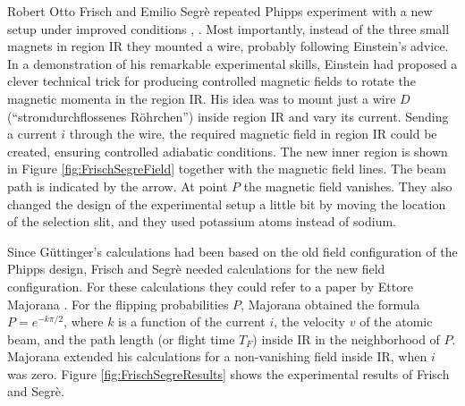 \documentclass{article}
\begin{document}
Robert Otto Frisch and Emilio Segrè repeated Phipps experiment with a new setup under improved conditions \citep{FrischOEtal1933Einstellung}, \cite[pp.~68--71]{SegreE1993Mind}.  Most importantly, instead of the three small magnets in region IR they mounted a wire, probably following Einstein's advice. In a demonstration of his remarkable experimental skills, Einstein had proposed a clever technical trick for producing controlled magnetic fields to rotate the magnetic momenta in the region IR.  His idea was to mount just a wire $D$ (``stromdurchflossenes Röhrchen'') inside region IR and vary its current. Sending a current $i$ through the wire, the required magnetic field in region IR could be created, ensuring controlled adiabatic conditions. The new inner region is shown in Figure \ref{fig:FrischSegreField} together with the magnetic field lines. The beam path is indicated by the arrow. 
At point $P$ the magnetic field vanishes. They also changed the design of the experimental setup a little bit by moving the location of the selection slit, and they used potassium atoms instead of sodium.

Since Güttinger's calculations had been based on the old field configuration of the Phipps design, Frisch and Segrè needed calculations for the new field configuration. For these calculations they could refer to a paper by Ettore Majorana \citep{MajoranaE1932Atomi,InguscioM2006Comment}. For the flipping probabilities $P$, Majorana obtained the formula $P=e^{-k\pi/2}$, where $k$ is a function of the current $i$, the velocity $v$ of the atomic beam, and the path length (or flight time $T_F$) inside IR in the neighborhood of $P$. Majorana extended his calculations for a non-vanishing field inside IR, when $i$ was zero. Figure \ref{fig:FrischSegreResults} shows the experimental results of Frisch and Segrè. 
\end{document}
